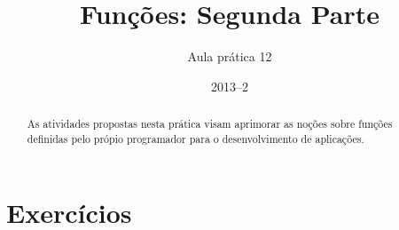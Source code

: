 \documentclass[11pt]{practice}
\begin{document}
\subtitle{Aula prática 12}
\title{Funções: Segunda Parte}
\author{}
\date{2013--2}
\maketitle

\begin{abstract}
  As atividades propostas nesta prática visam aprimorar as noções sobre
  funções definidas pelo própio programador para o desenvolvimento de
  aplicações.
\end{abstract}


\section{Exercícios}
\end{document}
